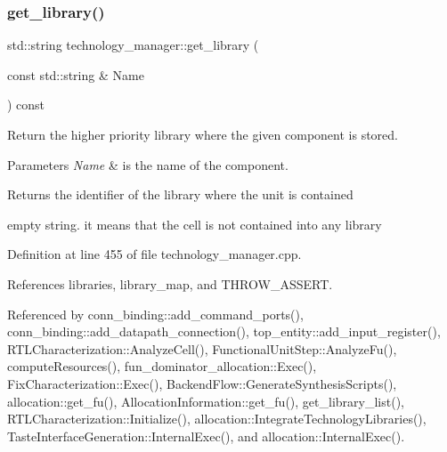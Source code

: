 \subsubsection{\texorpdfstring{get\+\_\+library()}{get\_library()}}
{\footnotesize\ttfamily std\+::string technology\+\_\+manager\+::get\+\_\+library (\begin{DoxyParamCaption}\item[{const std\+::string \&}]{Name }\end{DoxyParamCaption}) const}



Return the higher priority library where the given component is stored. 


\begin{DoxyParams}{Parameters}
{\em Name} & is the name of the component. \\
\hline
\end{DoxyParams}
\begin{DoxyReturn}{Returns}
the identifier of the library where the unit is contained 
\end{DoxyReturn}
empty string. it means that the cell is not contained into any library 

Definition at line 455 of file technology\+\_\+manager.\+cpp.



References libraries, library\+\_\+map, and T\+H\+R\+O\+W\+\_\+\+A\+S\+S\+E\+RT.



Referenced by conn\+\_\+binding\+::add\+\_\+command\+\_\+ports(), conn\+\_\+binding\+::add\+\_\+datapath\+\_\+connection(), top\+\_\+entity\+::add\+\_\+input\+\_\+register(), R\+T\+L\+Characterization\+::\+Analyze\+Cell(), Functional\+Unit\+Step\+::\+Analyze\+Fu(), compute\+Resources(), fun\+\_\+dominator\+\_\+allocation\+::\+Exec(), Fix\+Characterization\+::\+Exec(), Backend\+Flow\+::\+Generate\+Synthesis\+Scripts(), allocation\+::get\+\_\+fu(), Allocation\+Information\+::get\+\_\+fu(), get\+\_\+library\+\_\+list(), R\+T\+L\+Characterization\+::\+Initialize(), allocation\+::\+Integrate\+Technology\+Libraries(), Taste\+Interface\+Generation\+::\+Internal\+Exec(), and allocation\+::\+Internal\+Exec().

